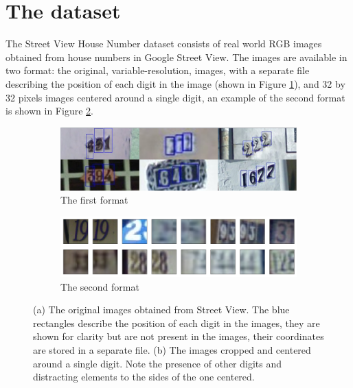 \documentclass[12pt]{article}
\begin{document}
\section*{The dataset}
The Street View House Number dataset consists of real world RGB images obtained from house numbers in Google Street View. The images are available in two format: the original, variable-resolution, images, with a separate file describing the position of each digit in the image (shown in Figure \ref{fig:svhn1}), and
32 by 32 pixels images centered around a single digit, an example of the second format is shown in Figure \ref{fig:svhn2}.

\begin{figure}[h]\centering
	\begin{subfigure}{\textwidth}
		\includegraphics[width=\textwidth]{svhn-ocr}
		\caption{The first format}
		\label{fig:svhn1}
	\end{subfigure}

	\begin{subfigure}{\textwidth}
		\includegraphics[width=\textwidth]{svhn-centered}
		\caption{The second format}
		\label{fig:svhn2}
	\end{subfigure}
	\label{fig:svhn}
	\caption{(a) The original images obtained from Street View. The blue rectangles describe the position of each digit in the images, they are shown for clarity but are not present in the images, their coordinates are stored in a separate file. (b) The images cropped and centered around a single digit. Note the presence of other digits and distracting elements to the sides of the one centered.}
\end{figure}
\end{document}

